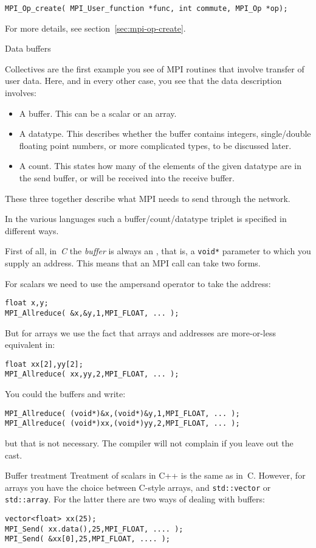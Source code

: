 \begin{lstlisting}
MPI_Op_create( MPI_User_function *func, int commute, MPI_Op *op);
\end{lstlisting}

For more details, see section~\ref{sec:mpi-op-create}.

 {Data buffers}
\label{sec:mpi-buffers}

Collectives are the first example you see of MPI routines that
involve transfer of user data. Here, and in every other case,
you see that the data description involves:
\begin{itemize}
\item A buffer. This can be a scalar or an array.
\item A datatype. This describes whether the buffer contains integers,
  single/double floating point numbers, or more complicated types, to
  be discussed later.
\item A count. This states how many of the elements of the given
  datatype are in the send buffer, or will be received into the receive buffer.
\end{itemize}
These three together describe what MPI needs to send through the network.

In the various languages such a buffer/count/datatype triplet is specified in
different ways.

First of all, in~\emph{C} the
\emph{buffer}
is always an , that is,
a \lstinline+void*+ parameter to which you supply an address.
This means that an MPI call can take two forms.

For scalars we need to use the ampersand operator to take the address:
\begin{lstlisting}
float x,y;
MPI_Allreduce( &x,&y,1,MPI_FLOAT, ... );
\end{lstlisting}
But for arrays we use the fact that arrays and addresses are more-or-less
equivalent in:
\begin{lstlisting}
float xx[2],yy[2];
MPI_Allreduce( xx,yy,2,MPI_FLOAT, ... );
\end{lstlisting}
You could  the buffers and write:
\begin{lstlisting}
MPI_Allreduce( (void*)&x,(void*)&y,1,MPI_FLOAT, ... );
MPI_Allreduce( (void*)xx,(void*)yy,2,MPI_FLOAT, ... );
\end{lstlisting}
but that is not necessary. The compiler will not complain
if you leave out the cast.

\begin{cppnote}{Buffer treatment}
  Treatment of scalars in C++ is the same as in~C.
  However, for arrays you have the choice between C-style arrays,
  and \lstinline+std::vector+ or \lstinline+std::array+.
  For the latter there are two ways of dealing with buffers:
\begin{lstlisting}
vector<float> xx(25);
MPI_Send( xx.data(),25,MPI_FLOAT, .... );
MPI_Send( &xx[0],25,MPI_FLOAT, .... );
\end{lstlisting}
\end{cppnote}

